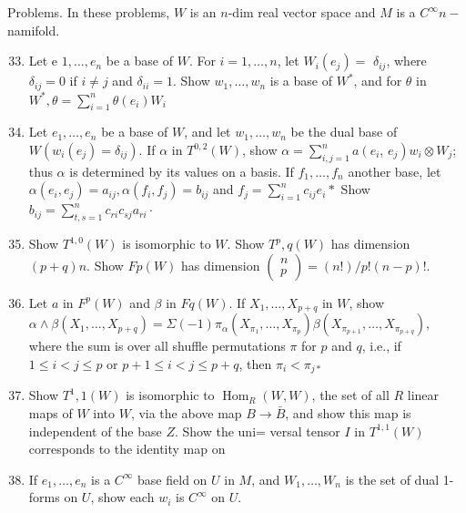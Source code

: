 \documentclass[10pt]{article}
\begin{document}
Problems. In these problems, $W$ is an $n$-dim real vector space and $M$ is a $C^{\infty} n-$ namifold.

\begin{enumerate}
  \setcounter{enumi}{32}
  \item Let e $1, \ldots, e_{n}$ be a base of $W .$ For $i=1, \ldots, n$, let $W_{i}\left(e_{j}\right)=$ $\delta_{i j}$, where $\delta_{i j}=0$ if $i \neq j$ and $\delta_{i i}=1$. Show $w_{1}, \ldots, w_{n}$ is a base of $W^{*}$, and for $\theta$ in $W^{*}, \theta=\sum_{i=1}^{n} \theta\left(e_{i}\right) W_{i}$

  \item Let $e_{1}, \ldots, e_{n}$ be a base of $W$, and let $w_{1}, \ldots, w_{n}$ be the dual base of $W\left(w_{i}\left(e_{j}\right)=\delta_{i j}\right)$. If $\alpha$ in $T^{0,2}(W)$, show $\alpha=\sum_{i, j=1}^{n} a\left(e_{i}\right.$, $\left.e_{j}\right) w_{i} \otimes W_{j}$; thus $\alpha$ is determined by its values on a basis. If $f_{1}, \ldots, f_{n}$ another base, let $\alpha\left(e_{i}, e_{j}\right)=a_{i j}, \alpha\left(f_{i}, f_{j}\right)=b_{i j}$ and $f_{j}=\sum_{i=1}^{n} c_{i j} e_{i} *$ Show $b_{i j}=\sum_{t, s=1}^{n} c_{r i} c_{s j} a_{r i} \cdot$

  \item Show $T^{1,0}(W)$ is isomorphic to $W$. Show $T^{p}, q(W)$ has dimension $(p+q) n$. Show $F p(W)$ has dimension $\left(\begin{array}{l}n \\ p\end{array}\right)=(n !) / p !(n-p) !$.

  \item Let $a$ in $F^{p}(W)$ and $\beta$ in $F q(W)$. If $X_{1}, \ldots, X_{p+q}$ in $W$, show $\alpha \wedge \beta\left(X_{1}, \ldots, X_{p+q}\right)=\Sigma(-1) \pi_{\alpha}\left(X_{\pi_{1}}, \ldots, X_{\pi_{p}}\right) \beta\left(X_{\pi_{p+1}}, \ldots, X_{\pi_{p+q}}\right)$, where the sum is over all shuffle permutations $\pi$ for $p$ and $q$, i.e., if $1 \leq i<j \leq p$ or $p+1 \leq i<j \leq p+q$, then $\pi_{i}<\pi_{j *}$

  \item Show $T^{1}, 1(W)$ is isomorphic to $\operatorname{Hom}_{R}(W, W)$, the set of all $R$ linear maps of $W$ into $W$, via the above map $B \rightarrow \bar{B}$, and show this map is independent of the base $Z .$ Show the uni= versal tensor $I$ in $T^{1,1}(W)$ corresponds to the identity map on

  \item If $e_{1}, \ldots, e_{n}$ is a $C^{\infty}$ base field on $U$ in $M$, and $W_{1}, \ldots, W_{n}$ is the set of dual 1-forms on $U$, show each $w_{i}$ is $C^{\infty}$ on $U$.


\end{enumerate}
\end{document}
